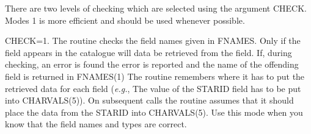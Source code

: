 \documentclass[11pt,nolof]{starlink}
\begin{document}
\begin{small}
{{      There are two levels of checking which are selected using the argument
      CHECK. Modes 1 is more efficient and should be used whenever possible.

      CHECK=1. The routine checks the field names given in FNAMES. Only if
      the field appears in the catalogue will data be
      retrieved from the field. If, during
      checking, an error is found the error is reported and the name of the
      offending field is returned in FNAMES(1)
      The routine remembers where it has to put the retrieved data for each
      field (\emph{e.g.}, The value of the STARID field has to be put into CHARVALS(5)).
      On subsequent calls the routine assumes that it should place the data
      from the STARID into CHARVALS(5). Use this mode when you know that the
      field names and types are correct.

}}
\end{small}
\end{document}
